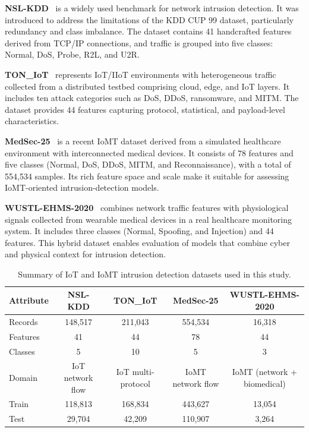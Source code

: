 \documentclass[journal,twoside,web]{ieeecolor}
\begin{document}
\textbf{NSL-KDD}~\cite{tavallaee2009nslkdd} is a widely used benchmark
for network intrusion detection. It was introduced to address the
limitations of the KDD CUP 99 dataset, particularly redundancy and
class imbalance. The dataset contains 41 handcrafted features derived
from TCP/IP connections, and traffic is grouped into five classes:
Normal, DoS, Probe, R2L, and U2R.

\textbf{TON\_IoT}~\cite{moustafa2021toniot} represents IoT/IIoT
environments with heterogeneous traffic collected from a distributed
testbed comprising cloud, edge, and IoT layers. It includes ten attack
categories such as DoS, DDoS, ransomware, and MITM. The dataset provides
44 features capturing protocol, statistical, and payload-level
characteristics.

\textbf{MedSec-25}~\cite{medsec25} is a recent IoMT dataset derived from
a simulated healthcare environment with interconnected medical devices.
It consists of 78 features and five classes (Normal, DoS, DDoS, MITM,
and Reconnaissance), with a total of 554,534 samples. Its rich feature
space and scale make it suitable for assessing IoMT-oriented
intrusion-detection models.

\textbf{WUSTL-EHMS-2020}~\cite{hady2020wustl} combines network traffic
features with physiological signals collected from wearable medical
devices in a real healthcare monitoring system. It includes three
classes (Normal, Spoofing, and Injection) and 44 features. This hybrid
dataset enables evaluation of models that combine cyber and physical
context for intrusion detection.

\begin{table}[t]
\caption{Summary of IoT and IoMT intrusion detection datasets used in this study.}
\label{tab:datasets_transposed}
\centering
\renewcommand{\arraystretch}{1.2}
\small
\begin{tabular}{@{}lcccc@{}}
\toprule
\textbf{Attribute} & \textbf{NSL-KDD} & \textbf{TON\_IoT} & \textbf{MedSec-25} & \textbf{WUSTL-EHMS-2020} \\
\midrule
Records   & 148,517 & 211,043 & 554,534 & 16,318 \\
Features  & 41      & 44      & 78      & 44 \\
Classes   & 5       & 10      & 5       & 3 \\
Domain    & IoT network flow & IoT multi-protocol & IoMT network flow & IoMT (network + biomedical) \\
Train     & 118,813 & 168,834 & 443,627 & 13,054 \\
Test      & 29,704  & 42,209  & 110,907 & 3,264 \\
\bottomrule
\end{tabular}
\end{table}
\end{document}
